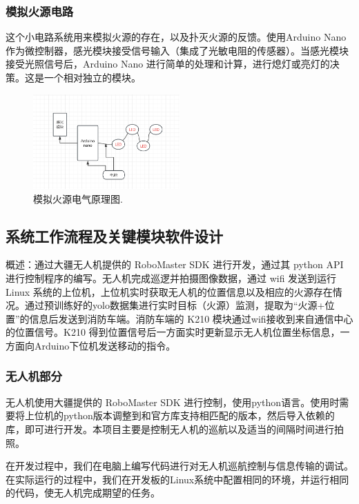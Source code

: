 \documentclass[12pt, a4paper, oneside]{article}
\begin{document}
\subsubsection{模拟火源电路}

这个小电路系统用来模拟火源的存在，以及扑灭火源的反馈。使用Arduino Nano作为微控制器，感光模块接受信号输入（集成了光敏电阻的传感器）。当感光模块接受光照信号后，Arduino Nano 进行简单的处理和计算，进行熄灯或亮灯的决策。这是一个相对独立的模块。

\begin{figure}[H]
    \centering
    \includegraphics[width=0.5\textwidth]{image-4.png}
    \caption{模拟火源电气原理图.}
    \label{模拟火源电气原理图}
\end{figure}

\subsection{系统工作流程及关键模块软件设计}

概述：通过大疆无人机提供的 RoboMaster SDK 进行开发，通过其 python API 进行控制程序的编写。无人机完成巡逻并拍摄图像数据，通过 wifi 发送到运行 Linux 系统的上位机，上位机实时获取无人机的位置信息以及相应的火源存在情况。通过预训练好的yolo数据集进行实时目标（火源）监测，提取为“火源+位置”的信息后发送到消防车端。消防车端的 K210 模块通过wifi接收到来自通信中心的位置信号。K210 得到位置信号后一方面实时更新显示无人机位置坐标信息，一方面向Arduino下位机发送移动的指令。

\subsubsection{无人机部分}

无人机使用大疆提供的 RoboMaster SDK 进行控制，使用python语言。使用时需要将上位机的python版本调整到和官方库支持相匹配的版本，然后导入依赖的库，即可进行开发。本项目主要是控制无人机的巡航以及适当的间隔时间进行拍照。

在开发过程中，我们在电脑上编写代码进行对无人机巡航控制与信息传输的调试。在实际运行的过程中，我们在开发板的Linux系统中配置相同的环境，并运行相同的代码，使无人机完成期望的任务。
\end{document}
